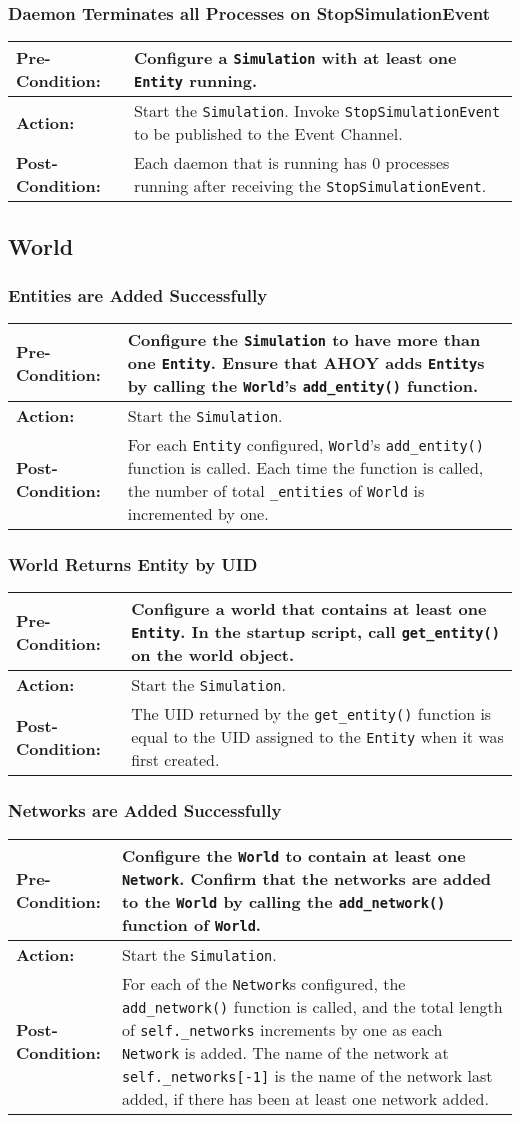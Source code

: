 \documentclass[titlepage]{article}
\newcommand{\testcase}[3]{
    \begin{center}
    \begin{tabular}{| l | p{0.7\textwidth}|}
        \hline
        \rowcolor[gray]{0.8}\textbf{Pre-Condition:} & #1 \\ \hline
        \textbf{Action:} & #2 \\ \hline
        \rowcolor[gray]{0.8}\textbf{Post-Condition:} & #3 \\ \hline
    \end{tabular}
    \end{center}
}
\begin{document}
\subsubsection{Daemon Terminates all Processes on StopSimulationEvent}
\testcase{Configure a \texttt{Simulation} with at least one \texttt{Entity} running.}{Start the \texttt{Simulation}. Invoke \texttt{StopSimulationEvent} to be published to the Event Channel.}{Each daemon that is running has 0 processes running after receiving the \texttt{StopSimulationEvent}.}

\subsection{World}
\subsubsection{Entities are Added Successfully}
\testcase{Configure the \texttt{Simulation} to have more than one \texttt{Entity}.  Ensure that AHOY adds \texttt{Entity}s by calling the \texttt{World}'s \texttt{add\_entity()} function.}{Start the \texttt{Simulation}.}{For each \texttt{Entity} configured, \texttt{World}'s \texttt{add\_entity()} function is called.  Each time the function is called, the number of total \texttt{\_entities} of \texttt{World} is incremented by one.}

\subsubsection{World Returns Entity by UID}
\testcase{Configure a world that contains at least one \texttt{Entity}. In the startup script, call \texttt{get\_entity()} on the world object.}{Start the \texttt{Simulation}.}{The UID returned by the \texttt{get\_entity()} function is equal to the UID assigned to the \texttt{Entity} when it was first created.}

\subsubsection{Networks are Added Successfully}
\testcase{Configure the \texttt{World} to contain at least one \texttt{Network}.  Confirm that the networks are added to the \texttt{World} by calling the \texttt{add\_network()} function of \texttt{World}.}{Start the \texttt{Simulation}.}{For each of the \texttt{Network}s configured, the \texttt{add\_network()} function is called, and the total length of \texttt{self.\_networks} increments by one as each \texttt{Network} is added.  The name of the network at \texttt{self.\_networks[-1]} is the name of the network last added, if there has been at least one network added.}
\end{document}
